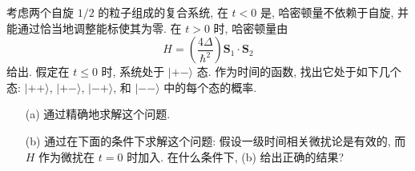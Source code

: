 \documentclass{assignment}
\begin{document}
\begin{prob}[课本习题 5.29]
    考虑两个自旋 $1/2$ 的粒子组成的复合系统, 在 $t<0$ 是, 哈密顿量不依赖于自旋, 并能通过恰当地调整能标使其为零. 在 $t>0$ 时, 哈密顿量由
    \[
        H=\left(\frac{4\Delta}{\hbar^2}\right)\bm{S}_1\cdot\bm{S}_2
    \]
    给出. 假定在 $t\leq 0$ 时, 系统处于 $\lvert+-\rangle$ 态. 作为时间的函数, 找出它处于如下几个态: $\lvert++\rangle$, $\lvert+-\rangle$, $\lvert-+\rangle$, 和 $\lvert--\rangle$ 中的每个态的概率.
    \begin{itemize}
        \item[(a)] 通过精确地求解这个问题.
        \item[(b)] 通过在下面的条件下求解这个问题: 假设一级时间相关微扰论是有效的, 而 $H$ 作为微扰在 $t=0$ 时加入. 在什么条件下, (b) 给出正确的结果?
    \end{itemize}
\end{prob}
\end{document}

